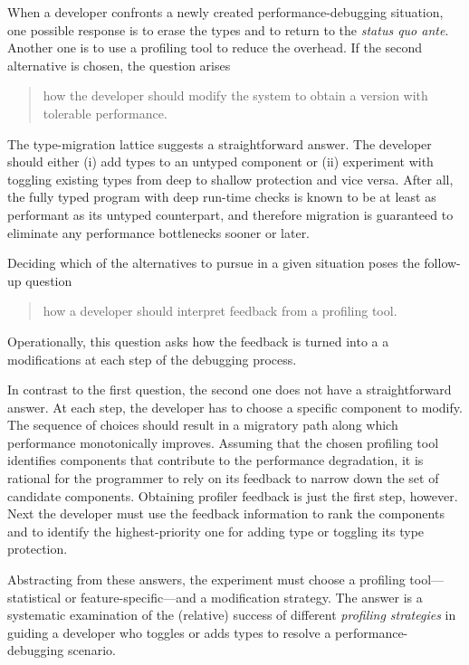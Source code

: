 
When a developer confronts a newly created performance-debugging situation, one
possible response is to erase the types and to return to the {\em status quo
ante\/}.  Another one is to use a profiling tool to reduce the overhead. If the
second alternative is chosen, the question arises 

\begin{quote} \em

 how the developer should modify the system to obtain a version with tolerable
 performance.
 
\end{quote}   
The type-migration lattice suggests a straightforward answer.  The developer
should either (i) add types to an untyped component or (ii) experiment with
toggling existing types from deep to shallow protection and vice versa.  After
all, the fully typed program with deep run-time checks is known to be at least
as performant as its untyped counterpart, and therefore migration is guaranteed
to eliminate any performance bottlenecks sooner or later. 

Deciding which of the alternatives to pursue in a given situation poses the
follow-up question 

\begin{quote} \em

\item how a developer should interpret feedback from a profiling tool. 

\end{quote}   
Operationally, this question asks how the feedback is turned into a a
modifications at each step of the debugging process.

In contrast to the first question, the second one does not have a
straightforward answer.  At each step, the developer has to choose a specific
component to modify.  The sequence of choices should result in a migratory path
along which performance monotonically improves. Assuming that the chosen
profiling tool identifies components that contribute to the performance
degradation, it is rational for the programmer to rely on its feedback to narrow
down the set of candidate components.  Obtaining profiler feedback is just the
first step, however. Next the developer must use the feedback information to
rank the components and to identify the highest-priority one for adding type or
toggling its type protection. 

Abstracting from these answers, the experiment must choose a profiling
tool---statistical or feature-specific---and a modification strategy. The answer
is a systematic examination of the (relative) success of different
\emph{profiling strategies} in guiding a developer who toggles or adds types to
resolve a performance-debugging scenario.

